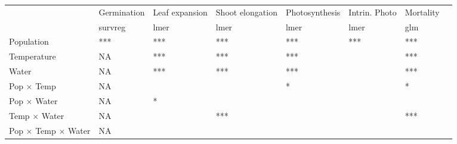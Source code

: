 \documentclass[11pt, oneside]{article}\usepackage[]{graphicx}\usepackage[]{color}
\begin{document}

\begin{table}[ht]
   \centering
   \begin{tabular}{@{} llllllll @{}}
      \toprule
                                   & Germination & Leaf expansion & Shoot elongation & Photosynthesis & Intrin. Photo & Mortality \\
                                   & survreg     & lmer           & lmer            & lmer           & lmer          & glm \\
      \midrule
  Population                       &
    ***  &
    *** &
    *** &
    *** & 
    *** & 
    *** & \\
  Temperature                      &
    NA                                                          &
    ***    &
    *** &
    *** & 
     &
    *** & \\
  Water                            &
    NA                                                          &
    ***   &
    ***   &
    *** & 
     &     
    *** & \\
  Pop $\times$ Temp                &
    NA                                                          &
     &
     &
    * & 
     &     
    * & \\
  Pop $\times$ Water               &
     NA                                                          &
    * &
     &
     & 
     &     
     & \\
  Temp $\times$ Water              &
    NA                                                          &
     &
    *** &
     & 
     &     
    *** & \\
  Pop $\times$ Temp $\times$ Water &
    NA                                                          &
     &
     &
     & 
     &     
     & \\
      \bottomrule
   \end{tabular}
   \label{table:Table_AnovaSummary}
\end{table}

\end{document}

